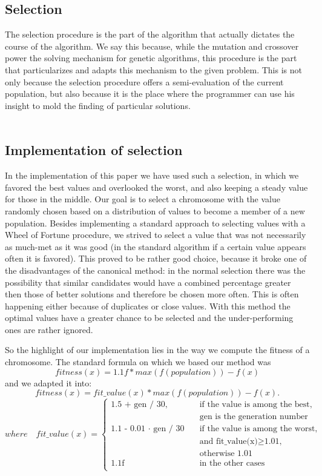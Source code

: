 \documentclass{article}
\begin{document}
\subsection{Selection}
The selection procedure is the part of the algorithm that actually dictates the course of the algorithm. We say this because, while the mutation and crossover power the solving mechanism for genetic algorithms, this procedure is the part that particularizes and adapts this mechanism to the given problem. This is not only because the selection procedure offers a semi-evaluation of the current population, but also because it is the place where the programmer can use his insight to mold the finding of particular solutions. \\\\

\subsection{Implementation of selection}
In the implementation of this paper we have used such a selection, in which we favored the best values and overlooked the worst, and also keeping a steady value for those in the middle. Our goal is to select a chromosome with the value randomly chosen based on a distribution of values to become a member of a new population. Besides implementing a standard approach to selecting values with a Wheel of Fortune procedure, we strived to select a value that was not necessarily as much-met as it was good (in the standard algorithm if a certain value appears often it is favored). This proved to be rather good choice, because it broke one of the disadvantages of the canonical method: in the normal selection there was the possibility that similar candidates would have a combined percentage greater then those of better solutions and therefore be chosen more often. This is often happening either because of duplicates or close values. With this method the optimal values have a greater chance to be selected and the under-performing ones are rather ignored. \\
\par So the highlight of our implementation lies in the way we compute the fitness of a chromosome. The standard formula on which we based our method was $$fitness(x) = 1.1f * max(f(population)) - f(x)$$ and we adapted it into: $$fitness(x) = fit\_value(x) * max(f(population)) - f(x).$$$$ where \quad fit\_value(x) =
\begin{cases}
   \text{1.5 + gen / 30,} &\quad\text{if the value is among the best,} \\
   \text{ } &\quad\text{gen is the generation number} \\
   \text{1.1 - 0.01 $\cdot$ gen / 30} &\quad\text{if the value is among the worst,}\\
   \text{ } &\quad\text{and fit\_value(x)}\ge\text{1.01,} \\
   \text{ } &\quad\text{otherwise 1.01} \\
   \text{1.1f} &\quad\text{in the other cases} \\
 \end{cases}$$
\end{document}
